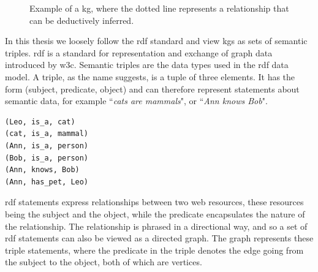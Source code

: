 \begin{figure}[htbp]
\centering
{}

\caption[Simple visual example of a KG.]{Example of a \gls{kg}, where the dotted line represents a relationship that can be deductively inferred.} \label{fig:KGexample}
\end{figure}

In this thesis we loosely follow the \gls{rdf} standard and view \glspl{kg} as sets of semantic triples. \gls{rdf} is a standard for representation and exchange of graph data introduced by \gls{w3c}. Semantic triples are the data types used in the \gls{rdf} data model. A triple, as the name suggests, is a tuple of three elements. It has the form (subject, predicate, object) and can therefore represent statements about semantic data, for example ``\textit{cats are mammals}", or ``\textit{Ann knows Bob}". 
\begin{lstlisting}[caption={Example of RDF triple set written in informal pseudocode.}, label={RDF_triples_example}]
(Leo, is_a, cat)
(cat, is_a, mammal)
(Ann, is_a, person)
(Bob, is_a, person)
(Ann, knows, Bob)
(Ann, has_pet, Leo)
\end{lstlisting}
\gls{rdf} statements express relationships between two web resources, these resources being the subject and the object, while the predicate encapsulates the nature of the relationship. The relationship is phrased in a directional way, and so a set of \gls{rdf} statements can also be viewed as a directed graph. The graph represents these triple statements, where the predicate in the triple denotes the edge going from the subject to the object, both of which are vertices.

